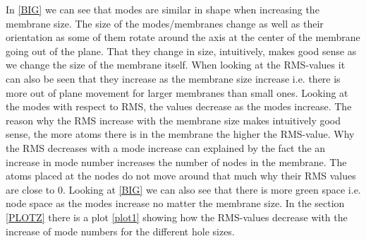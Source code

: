 In \cref{BIG} we can see that modes are similar in shape when increasing the membrane size. The size of the modes/membranes change as well as their orientation as some of them rotate around the axis at the center of the membrane going out of the plane. That they change in size, intuitively, makes good sense as we change the size of the membrane itself. When looking at the RMS-values it can also be seen that they increase as the membrane size increase i.e. there is more out of plane movement for larger membranes than small ones. Looking at the modes with respect to RMS, the values decrease as the modes increase. The reason why the RMS increase with the membrane size makes intuitively good sense, the more atoms there is in the membrane the higher the RMS-value. Why the RMS decreases with a mode increase can explained by the fact the an increase in mode number increases the number of nodes in the membrane. The atoms placed at the nodes do not move around that much why their RMS values are close to 0. Looking at \cref{BIG} we can also see that there is more green space i.e. node space as the modes increase no matter the membrane size. In the section \cref{PLOTZ} there is a plot \cref{plot1} showing how the RMS-values decrease with the increase of mode numbers for the different hole sizes.
